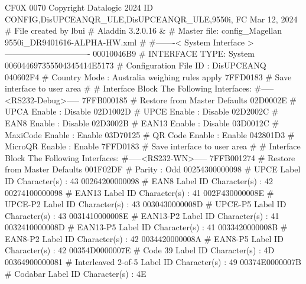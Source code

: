 CF0X 0070
Copyright Datalogic 2024
ID CONFIG,DisUPCEANQR_ULE,DisUPCEANQR_ULE,9550i,
FC Mar 12, 2024
# File created by lbui
# Aladdin 3.2.0.16
&
# Master file: config_Magellan 9550i_DR9401616-ALPHA-HW.xml
#
#-------< System Interface >-------------------------------
00010046B9                     # INTERFACE TYPE: System
006044697355504345414E5173     # Configuration File ID                    : DisUPCEANQ
040602F4                       # Country Mode                             : Australia weighing rules apply
7FFD0183                       # Save interface to user area
#
# Interface Block The Following Interfaces:
#-----<RS232-Debug>-----
7FFB000185                     # Restore from Master Defaults
02D0002E                       # UPCA Enable                              :    Disable
02D1002D                       # UPCE Enable                              :    Disable
02D2002C                       # EAN8 Enable                              :    Disable
02D3002B                       # EAN13 Enable                             :    Disable
03D0012C                       # MaxiCode Enable                          :     Enable
03D70125                       # QR Code Enable                           :     Enable
042801D3                       # MicroQR Enable                           :     Enable
7FFD0183                       # Save interface to user area
#
# Interface Block The Following Interfaces:
#-----<RS232-WN>-----
7FFB001274                     # Restore from Master Defaults
001F02DF                       # Parity                                   :        Odd
00254300000098                 # UPCE Label ID Character(s)               :         43
00264200000098                 # EAN8 Label ID Character(s)               :         42
00274100000098                 # EAN13 Label ID Character(s)              :         41
002F430000008E                 # UPCE-P2 Label ID Character(s)            :         43
0030430000008D                 # UPCE-P5 Label ID Character(s)            :         43
0031410000008E                 # EAN13-P2 Label ID Character(s)           :         41
0032410000008D                 # EAN13-P5 Label ID Character(s)           :         41
0033420000008B                 # EAN8-P2 Label ID Character(s)            :         42
0034420000008A                 # EAN8-P5 Label ID Character(s)            :         42
00354D0000007E                 # Code 39 Label ID Character(s)            :         4D
00364900000081                 # Interleaved 2-of-5 Label ID Character(s) :         49
00374E0000007B                 # Codabar Label ID Character(s)            :         4E
